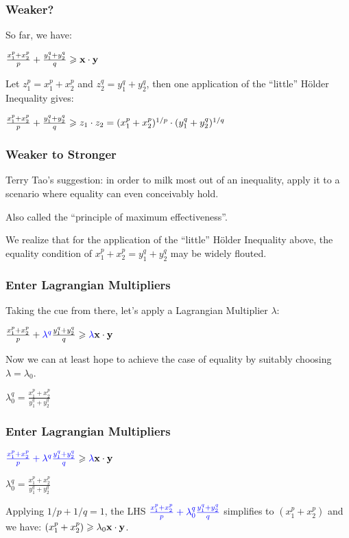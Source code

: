 \documentclass{beamer}
\begin{document}
\begin{frame}
\frametitle{Weaker?}
So far, we have:
\begin{center}
$\frac{x_1^p + x_2^p}{p}+\frac{y_1^q + y_2^q}{q} \geqslant \mathbf{x}\cdot \mathbf{y}$
\end{center}
Let $z_1^p = x_1^p + x_2^p$ and $z_2^q = y_1^q + y_2^q$, then one application of the 
``little'' H\"{o}lder Inequality gives:
\begin{center}
$\frac{x_1^p + x_2^p}{p}+\frac{y_1^q + y_2^q}{q} \geqslant z_1 \cdot z_2 = (x_1^p + x_2^p)^{1/p}\cdot (y_1^q + y_2^q)^{1/q}$
\end{center}
\end{frame}

\begin{frame}
\frametitle{Weaker to Stronger}
Terry Tao's suggestion: in order to milk most out of an inequality, apply it to a scenario where equality can
even conceivably hold. 

Also called the ``principle of maximum effectiveness''.

We realize that for the application of the ``little'' H\"{o}lder Inequality above, 
the equality condition of $x_1^p + x_2^p = y_1^q + y_2^q$ may be widely flouted. 
\end{frame}

\begin{frame}
\frametitle{Enter Lagrangian Multipliers}

Taking the cue from there, let's apply a Lagrangian Multiplier $\lambda$:
\begin{center} 
$\frac{x_1^p + x_2^p}{p}+{\color{blue}\lambda^q}\frac{y_1^q + y_2^q}{q} \geqslant {\color{blue}\lambda}\mathbf{x}\cdot \mathbf{y}$
\end{center}

Now we can at least hope to achieve the case of equality by suitably choosing $\lambda = \lambda_0$.
\pause
\begin{center} 
$\lambda_0^q = \frac{x_1^p + x_2^p}{y_1^q + y_2^q}$
\end{center}
\end{frame}

\begin{frame}
\frametitle{Enter Lagrangian Multipliers}
\begin{center} 
${\color{blue}\frac{x_1^p + x_2^p}{p}+{\color{blue}\lambda^q}\frac{y_1^q + y_2^q}{q}} \geqslant {\color{blue}\lambda}\mathbf{x}\cdot \mathbf{y}$
\end{center}
\begin{center}
$\lambda_0^q = \frac{x_1^p + x_2^p}{y_1^q + y_2^q}$
\end{center}
Applying $1/p + 1/q = 1$, 
the LHS ${\color{blue}\frac{x_1^p + x_2^p}{p}+{\color{blue}\lambda_0^q}\frac{y_1^q + y_2^q}{q}}$ simplifies to 
$(x_1^p + x_2^p)$ and we have: $(x_1^p + x_2^p) \geqslant \lambda_0 \mathbf{x}\cdot \mathbf{y}$.
\end{frame}
\end{document}
